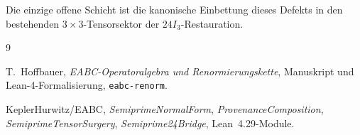 \documentclass[11pt,a4paper]{article}
\theoremstyle{definition}
\theoremstyle{remark}
\begin{document}
	Die einzige offene Schicht ist die kanonische Einbettung dieses Defekts in den
	bestehenden $3\times 3$-Tensorsektor der $24I_3$-Restauration.
	
	\begin{thebibliography}{9}
		
		T.~Hoffbauer,
		\emph{EABC-Operatoralgebra und Renormierungskette},
		Manuskript und Lean-4-Formalisierung,
		\texttt{eabc-renorm}.
		
		KeplerHurwitz/EABC,
		\emph{SemiprimeNormalForm}, \emph{ProvenanceComposition},
		\emph{SemiprimeTensorSurgery}, \emph{Semiprime24Bridge},
		Lean~4.29-Module.
		
	\end{thebibliography}
	
\end{document}
